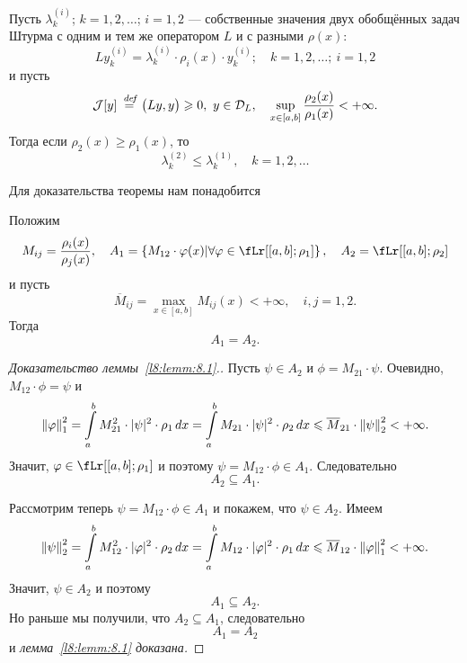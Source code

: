 \begin{_teor}\label{l8:teor:8.1}
	Пусть $\lambda_k^{(i)}$; $k=1,2,\ldots$; $i=1,2$ --- собственные значения двух обобщённых задач Штурма с одним и тем же оператором $L$  и с разными $\rho(x)$:
	\begin{equation*}
		Ly_k^{(i)}=\lambda_{k}^{(i)}\cdot\rho_i(x)\cdot y_k^{(i)};\quad k=1,2,\ldots;\ i=1,2
	\end{equation*}
	и пусть 
	\begin{equation*}
		\J[y]\eqdef\big(L y,y\big)\geqslant0,\ y\in\mc{D}_{L},\quad\sup\limits_{x\in[a,b]}\frac{\rho_2(x)}{\rho_1(x)}<+\infty.
	\end{equation*}
	Тогда если $\rho_2(x)\geqslant\rho_1(x)$, то
	\begin{equation}\label{l8:eq:1.5}
		\lambda_k^{(2)}\leqslant\lambda_k^{(1)},\quad k=1,2,\ldots
	\end{equation}
\end{_teor}
Для доказательства теоремы нам понадобится 
\begin{_lemm}\label{l8:lemm:8.1}
	Положим 
	\begin{equation*}
		M_{ij}=\frac{\rho_i(x)}{\rho_j(x)},\quad A_1=\left\{M_{12}\cdot\phi(x)|\forall\phi\in\fLr[{[a,b];\rho_1}]\right\},\quad A_2=\fLr[{[a,b];\rho_2}]
	\end{equation*}
	и пусть 
	\begin{equation*}
		\overline{M}_{ij}=\max\limits_{x\in[a,b]}M_{ij}(x)<+\infty,\quad i,j=1,2.
	\end{equation*}
	Тогда
	\begin{equation*}
		A_1=A_2.
	\end{equation*}
\end{_lemm}
\begin{proof}[Доказательство леммы~\ref{l8:lemm:8.1}.]
	Пусть $\psi\in A_2$ и $\phi=M_{21}\cdot\psi$. Очевидно, $M_{12}\cdot\phi=\psi$ и 
	\begin{equation*}
		\left\|\varphi\right\|_1^2=\int\limits_{a}^{b}M_{21}^2\cdot|\psi|^2\cdot\rho_1\,dx=\int\limits_{a}^{b}M_{21}\cdot|\psi|^2\cdot\rho_2\,dx\leqslant\overline{M}_{21}\cdot\left\|\psi\right\|_2^2<+\infty.
	\end{equation*}
	Значит, $\phi\in\fLr[{[a,b];\rho_1}]$ и поэтому $\psi=M_{12}\cdot\phi\in A_1$. Следовательно
	\begin{equation*}
		A_2\subseteq A_1.
	\end{equation*}

	Рассмотрим теперь $\psi=M_{12}\cdot\phi\in A_1$ и покажем, что $\psi\in A_2$. Имеем
	\begin{equation*}
		\left\|\psi\right\|_2^2=\int\limits_a^b M_{12}^2\cdot|\varphi|^2\cdot\rho_2\,dx=\int\limits_a^b M_{12}\cdot|\varphi|^2\cdot\rho_1\,dx\leqslant\overline{M}_{12}\cdot\left\|\varphi\right\|_1^2<+\infty.
	\end{equation*}
	Значит, $\psi\in A_2$ и поэтому 
	\begin{equation*}
		A_1\subseteq A_2.
	\end{equation*}
	Но раньше мы получили, что $A_2\subseteq A_1$, следовательно
	\begin{equation*}
		A_1=A_2
	\end{equation*}
	и \emph{лемма~\ref{l8:lemm:8.1} доказана.}
\end{proof}
